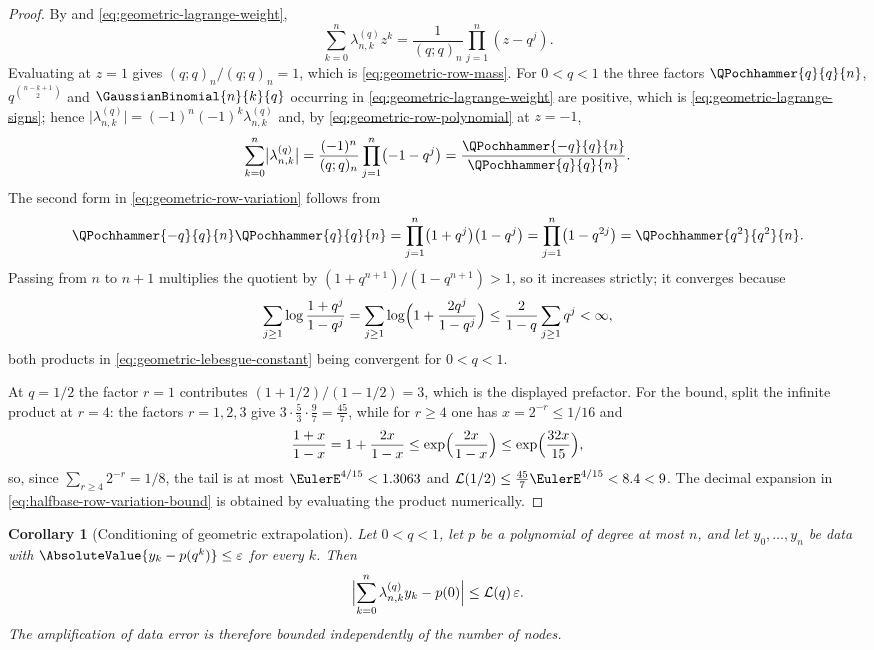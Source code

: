 \documentclass[11pt,a4paper,oneside,openany]{book}
\newtheorem{corollary}[corollary]{Corollary}
\theoremstyle{definition}
\theoremstyle{remark}
\newcommand{\eps}{\varepsilon}
\begin{document}
\begin{proof}
By  and \eqref{eq:geometric-lagrange-weight},
\begin{equation}\label{eq:geometric-row-polynomial}
 \sum_{k=0}^{n}\lambda_{n,k}^{(q)}z^k
 =\frac1{(q;q)_n}\prod_{j=1}^{n}(z-q^j).
\end{equation}
Evaluating at $z=1$ gives $(q;q)_n/(q;q)_n=1$, which is
\eqref{eq:geometric-row-mass}.  For $0<q<1$ the three factors $\QPochhammer{q}{q}{n}$,
$q^{\binom{n-k+1}{2}}$ and $\GaussianBinomial{n}{k}{q}$ occurring in
\eqref{eq:geometric-lagrange-weight} are positive, which is
\eqref{eq:geometric-lagrange-signs}; hence
$\bigl|\lambda_{n,k}^{(q)}\bigr|=(-1)^{n}(-1)^{k}\lambda_{n,k}^{(q)}$ and, by
\eqref{eq:geometric-row-polynomial} at $z=-1$,
\[
 \sum_{k=0}^{n}\bigl|\lambda_{n,k}^{(q)}\bigr|
 =\frac{(-1)^n}{(q;q)_n}\prod_{j=1}^{n}\bigl(-1-q^j\bigr)
 =\frac{\QPochhammer{-q}{q}{n}}{\QPochhammer{q}{q}{n}} .
\]
The second form in \eqref{eq:geometric-row-variation} follows from
\[
 \QPochhammer{-q}{q}{n}\QPochhammer{q}{q}{n}
 =\prod_{j=1}^{n}\bigl(1+q^j\bigr)\bigl(1-q^j\bigr)
 =\prod_{j=1}^{n}\bigl(1-q^{2j}\bigr)=\QPochhammer{q^2}{q^2}{n}.
\]
Passing from $n$ to $n+1$ multiplies the quotient by $(1+q^{n+1})/(1-q^{n+1})>1$, so it
increases strictly; it converges because
\[
 \sum_{j\ge1}\log\frac{1+q^j}{1-q^j}
 =\sum_{j\ge1}\log\Bigl(1+\frac{2q^j}{1-q^j}\Bigr)
 \le\frac2{1-q}\sum_{j\ge1}q^j<\infty,
\]
both products in \eqref{eq:geometric-lebesgue-constant} being convergent for $0<q<1$.

At $q=1/2$ the factor $r=1$ contributes $(1+1/2)/(1-1/2)=3$, which is the displayed
prefactor.  For the bound, split the infinite product at $r=4$: the factors $r=1,2,3$ give
$3\cdot\frac53\cdot\frac97=\frac{45}7$, while for $r\ge4$ one has $x=2^{-r}\le1/16$ and
\[
 \frac{1+x}{1-x}=1+\frac{2x}{1-x}\le\exp\Bigl(\frac{2x}{1-x}\Bigr)
 \le\exp\Bigl(\frac{32x}{15}\Bigr),
\]
so, since $\sum_{r\ge4}2^{-r}=1/8$, the tail is at most $\EulerE^{4/15}<1.3063$ and
$\mathcal L(1/2)\le\frac{45}7\EulerE^{4/15}<8.4<9$.  The decimal expansion in
\eqref{eq:halfbase-row-variation-bound} is obtained by evaluating the product
numerically.
\end{proof}

\begin{corollary}[Conditioning of geometric extrapolation]\label{cor:geometric-extrapolation-conditioning}
Let $0<q<1$, let $p$ be a polynomial of degree at most $n$, and let $y_0,\ldots,y_n$ be
data with $\AbsoluteValue{y_k-p(q^k)}\le\eps$ for every $k$.  Then
\begin{equation}\label{eq:geometric-extrapolation-conditioning}
 \Bigl|\sum_{k=0}^{n}\lambda^{(q)}_{n,k}y_k-p(0)\Bigr|\le\mathcal L(q)\,\eps .
\end{equation}
The amplification of data error is therefore bounded independently of the number of
nodes.
\end{corollary}
\end{document}
